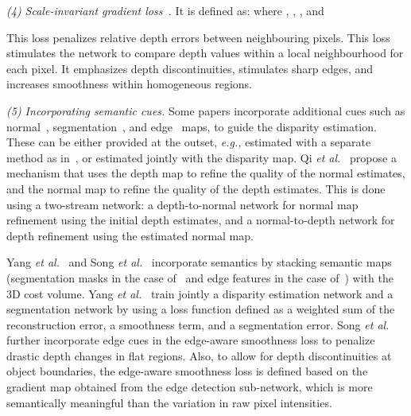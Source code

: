 \documentclass[10pt,journal,compsoc]{IEEEtran}
\newcommand{\eg}{\emph{e.g., }}
\newcommand{\etal}{\emph{et al.}}
\newcommand{\noi}{\noindent}
\begin{document}
		
\vspace{6pt}
\noi\textit{(4) Scale-invariant gradient loss~\cite{ummenhofer2017demon}.}  It is defined as:  
\noi where ,  , , and
		

\noi This loss penalizes relative depth errors between neighbouring pixels. This loss stimulates the network to compare depth values within a local neighbourhood for each pixel. It emphasizes depth discontinuities, stimulates sharp edges, and increases smoothness within homogeneous regions.



\vspace{6pt}
\noi \textit{(5) Incorporating semantic cues. }   Some papers incorporate additional cues such as normal~\cite{Qi_2018_CVPR}, segmentation~\cite{yang2018segstereo},  and edge~\cite{song2018stereo} maps, to guide the disparity estimation.  These can be either provided at the outset, \eg estimated with a separate method as in~\cite{song2018stereo}, or  estimated jointly with the disparity map. Qi \etal~\cite{Qi_2018_CVPR} propose a mechanism that uses the depth map to refine the quality of the normal estimates, and the normal map to refine the quality of the depth estimates. This is done using a  two-stream network: a depth-to-normal network for normal map refinement using the initial depth estimates, and a normal-to-depth network for depth refinement using the estimated normal map. 



Yang \etal~\cite{yang2018segstereo} and Song \etal~\cite{song2018stereo}  incorporate semantics by stacking semantic maps (segmentation masks in the case of~\cite{yang2018segstereo} and edge features in the case of~\cite{song2018stereo}) with the 3D cost volume. Yang \etal~\cite{yang2018segstereo}   train jointly a disparity estimation network and a segmentation network by using a loss function defined as a weighted sum of the reconstruction error, a smoothness term, and a segmentation error.   Song \etal~\cite{song2018stereo} further incorporate edge cues in the edge-aware smoothness loss to penalize  drastic depth changes in flat regions. Also, to allow for depth discontinuities at object boundaries,  the edge-aware smoothness loss is defined based on the gradient map  obtained from the edge detection sub-network, which is more semantically meaningful than the variation in raw pixel intensities.
\end{document}
